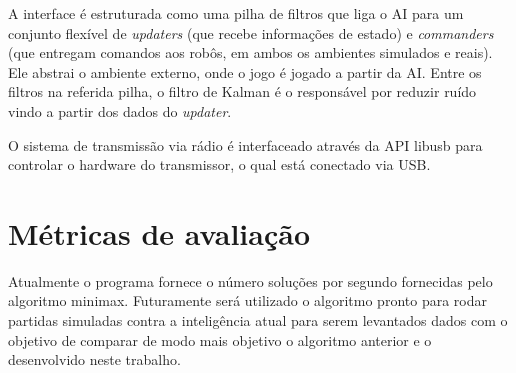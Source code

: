 A interface é estruturada como uma pilha de filtros que liga o AI para um
conjunto flexível de \textit{updaters} (que recebe informações de estado) e
\textit{commanders} (que entregam comandos aos robôs, em ambos os ambientes simulados
e reais). Ele abstrai o ambiente externo, onde o jogo é jogado a partir da AI\@.
Entre os filtros na referida pilha, o filtro de Kalman é o responsável por
reduzir ruído vindo a partir dos dados do \textit{updater}.

O sistema de transmissão via rádio é interfaceado através da  API libusb para
controlar o hardware do transmissor, o qual está conectado via USB\@.

\section{Métricas de avaliação}\label{sec:metricas}

Atualmente o programa fornece o número soluções por segundo fornecidas pelo
algoritmo minimax. Futuramente será utilizado o algoritmo pronto para rodar
partidas simuladas contra a inteligência atual para serem levantados dados com
o objetivo de comparar de modo mais objetivo o algoritmo anterior e o
desenvolvido neste trabalho.

